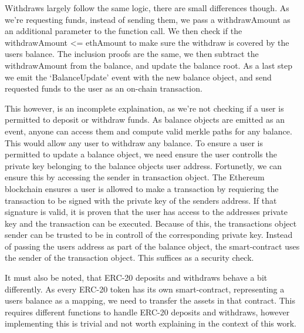 \documentclass[../../thesis.tex]{subfiles}
\begin{document}
Withdraws largely follow the same logic, there are small differences though. As we're requesting funds, instead of sending them, we pass a withdrawAmount as an additional parameter to the function call. We then check if the withdrawAmount <= ethAmount to make sure the withdraw is covered by the users balance. The inclusion proofs are the same, we then subtract the withdrawAmount from the balance, and update the balance root. As a last step we emit the `BalanceUpdate' event with the new balance object, and send requested funds to the user as an on-chain transaction.

This however, is an incomplete explaination, as we're not checking if a user is permitted to deposit or withdraw funds. As balance objects are emitted as an event, anyone can access them and compute valid merkle paths for any balance. This would allow any user to withdraw any balance. To ensure a user is permitted to update a balance object, we need ensure the user controlls the private key belonging to the balance objects user address. Fortunetly, we can ensure this by accessing the sender in transaction object. The Ethereum blockchain ensures a user is allowed to make a transaction by requiering the transaction to be signed with the private key of the senders address. If that signature is valid, it is proven that the user has access to the addresses private key and the transaction can be executed. Because of this, the transactions object sender can be trusted to be in controll of the corresponding private key. Instead of passing the users address as part of the balance object, the smart-contract uses the sender of the transaction object. This suffices as a security check.

It must also be noted, that ERC-20 deposits and withdraws behave a bit differently. As every ERC-20 token has its own smart-contract, representing a users balance as a mapping, we need to transfer the assets in that contract. This requires different functions to handle ERC-20 deposits and withdraws, however implementing this is trivial and not worth explaining in the context of this work. 
\end{document}
